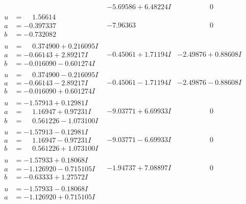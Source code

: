 \documentclass[1p]{elsarticle_modified}
\theoremstyle{definition}
\begin{document}
$$\begin{array}{c|c|c}
 & -5.69586 + 6.48224 I & \phantom{-0.000000 } 0 \\ \hline\begin{aligned}
u &= \phantom{-}1.56614\phantom{ +0.000000I} \\
a &= -0.397337\phantom{ +0.000000I} \\
b &= -0.732082\phantom{ +0.000000I}\end{aligned}
 & -7.96363\phantom{ +0.000000I} & \phantom{-0.000000 } 0 \\ \hline\begin{aligned}
u &= \phantom{-}0.374900 + 0.216095 I \\
a &= -0.66143 + 2.89217 I \\
b &= -0.016090 - 0.601274 I\end{aligned}
 & -0.45061 + 1.71194 I & -2.49876 + 0.88608 I \\ \hline\begin{aligned}
u &= \phantom{-}0.374900 - 0.216095 I \\
a &= -0.66143 - 2.89217 I \\
b &= -0.016090 + 0.601274 I\end{aligned}
 & -0.45061 - 1.71194 I & -2.49876 - 0.88608 I \\ \hline\begin{aligned}
u &= -1.57913 + 0.12981 I \\
a &= \phantom{-}1.16947 + 0.97231 I \\
b &= \phantom{-}0.561226 - 1.073100 I\end{aligned}
 & -9.03771 + 6.69933 I & \phantom{-0.000000 } 0 \\ \hline\begin{aligned}
u &= -1.57913 - 0.12981 I \\
a &= \phantom{-}1.16947 - 0.97231 I \\
b &= \phantom{-}0.561226 + 1.073100 I\end{aligned}
 & -9.03771 - 6.69933 I & \phantom{-0.000000 } 0 \\ \hline\begin{aligned}
u &= -1.57933 + 0.18068 I \\
a &= -1.126920 - 0.715105 I \\
b &= -0.63333 + 1.27572 I\end{aligned}
 & -1.94737 + 7.08897 I & \phantom{-0.000000 } 0 \\ \hline\begin{aligned}
u &= -1.57933 - 0.18068 I \\
a &= -1.126920 + 0.715105 I \\

\end{aligned}
\end{array}$$
\end{document}
